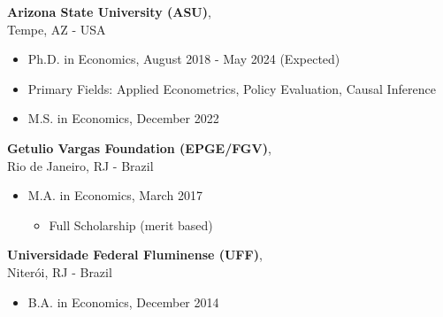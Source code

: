 \documentclass[11pt]{article}
\newenvironment{lonelist}[1][\enskip\textbullet]%
	{\begin{list}{#1}{%
				\setlength{\partopsep}{0pt}%
				\setlength{\topsep}{0pt}}}
		{\end{list}\vspace{-.6\baselineskip}}
\newenvironment{innerlist}[1][\enskip\textbullet]%
	{\begin{itemize}[#1,leftmargin=*,parsep=0pt,itemsep=0pt,topsep=0pt,partopsep=0pt]}
		{\end{itemize}}
\begin{document}
		\begin{lonelist}
			\item[] \textbf{Arizona State University (ASU)}, \\
			Tempe, AZ - USA
			\begin{innerlist}
				
				\item[] Ph.D. in
				Economics,
				\hfill August 2018 - May 2024 (Expected)
				\vspace{.03in}
				\item[] \small{Primary Fields: Applied Econometrics, Policy Evaluation, Causal Inference}
			\end{innerlist}
			\begin{innerlist}
				\item[] M.S. in
				Economics,
				\hfill December 2022
			\end{innerlist}
		\end{lonelist}
		\vspace{.2in}
		\begin{lonelist}
			\item[] \textbf{Getulio Vargas Foundation (EPGE/FGV)}, \\
			Rio de Janeiro, RJ - Brazil
			\begin{innerlist}
				\item[] M.A. in
				Economics,
				\hfill March 2017
				\begin{innerlist}
					\item[]Full Scholarship (merit based)
				\end{innerlist}
			\end{innerlist}
		\end{lonelist}
		\vspace{.2in}
		\begin{lonelist}
			\item[] \textbf{Universidade Federal Fluminense   (UFF)}, \\
			Niterói, RJ - Brazil
			
			\begin{innerlist}    
				\item[] B.A. in
				Economics, \hfill December 2014
			\end{innerlist}
		\end{lonelist}
		\vspace{.3in}
\end{document}
